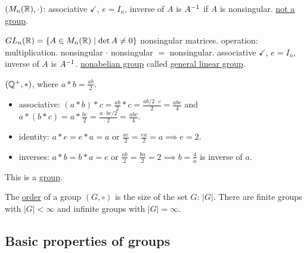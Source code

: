 \documentclass[]{article}
\begin{document}
\begin{example}
	$(M_n(\mathbb{R}),\cdot)$: associative $\checkmark$, $e= I_n$, inverse of $A$ is $A^{-1}$ if $A$ is nonsingular. \ul{not a group}.
\end{example}
\begin{example}
	$GL_n(\mathbb{R}) = \{A\in M_n(\mathbb{R}) \mid \det A \neq 0\}$ nonsingular matrices. operation: multiplication. nonsingular $\cdot$ nonsingular $=$ nonsingular. associative $\checkmark$, $e = I_n$, inverse of $A$ is $A^{-1}$. \ul{nonabelian group} called \ul{general linear group}.
\end{example}
\begin{example}
	$(\mathbb{Q}^+,*)$, where $a*b = \frac{ab}{2}$.
	\begin{itemize}
		\item associative: $(a*b)*c = \frac{ab}{2} * c = \frac{ab/2\cdot c}{2} = \frac{abc}{4}$ and $a*(b*c) = a*\frac{bc}{2} = \frac{a\cdot bc/2}{2} = \frac{abc}{4}$.
		\item identity: $a*e = e*a = a$ or $\frac{ae}{2} = \frac{ea}{2} = a \implies e = 2$.
		\item inverses: $a*b = b*a = e$ or $\frac{ab}{2} = \frac{ba}{2} = 2 \implies b = \frac{4}{a}$ is inverse of $a$.
	\end{itemize}
	This is a \ul{group}.
\end{example}

\begin{definition}
	The \ul{order} of a group $(G,\circ)$ is the size of the set $G$: $|G|$. There are finite groups with $|G|<\infty$ and infinite groups with $|G|=\infty$.
\end{definition}

\subsection{Basic properties of groups}
\end{document}
